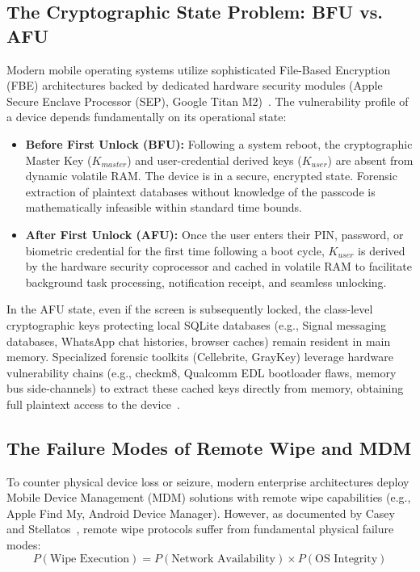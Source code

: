 \subsection{The Cryptographic State Problem: BFU vs. AFU}
Modern mobile operating systems utilize sophisticated File-Based Encryption (FBE) architectures backed by dedicated hardware security modules (Apple Secure Enclave Processor (SEP), Google Titan M2)~\cite{grapheneos2024}. The vulnerability profile of a device depends fundamentally on its operational state:
\begin{itemize}
    \item \textbf{Before First Unlock (BFU):} Following a system reboot, the cryptographic Master Key ($K_{master}$) and user-credential derived keys ($K_{user}$) are absent from dynamic volatile RAM. The device is in a secure, encrypted state. Forensic extraction of plaintext databases without knowledge of the passcode is mathematically infeasible within standard time bounds.
    \item \textbf{After First Unlock (AFU):} Once the user enters their PIN, password, or biometric credential for the first time following a boot cycle, $K_{user}$ is derived by the hardware security coprocessor and cached in volatile RAM to facilitate background task processing, notification receipt, and seamless unlocking. 
\end{itemize}

In the AFU state, even if the screen is subsequently locked, the class-level cryptographic keys protecting local SQLite databases (e.g., Signal messaging databases, WhatsApp chat histories, browser caches) remain resident in main memory. Specialized forensic toolkits (Cellebrite, GrayKey) leverage hardware vulnerability chains (e.g., checkm8, Qualcomm EDL bootloader flaws, memory bus side-channels) to extract these cached keys directly from memory, obtaining full plaintext access to the device~\cite{cellebrite2023whitepaper, graykey2023architecture}.

\subsection{The Failure Modes of Remote Wipe and MDM}
To counter physical device loss or seizure, modern enterprise architectures deploy Mobile Device Management (MDM) solutions with remote wipe capabilities (e.g., Apple Find My, Android Device Manager). However, as documented by Casey and Stellatos~\cite{casey2011digital}, remote wipe protocols suffer from fundamental physical failure modes:
\begin{equation}
    P(\text{Wipe Execution}) = P(\text{Network Availability}) \times P(\text{OS Integrity})
\end{equation}

